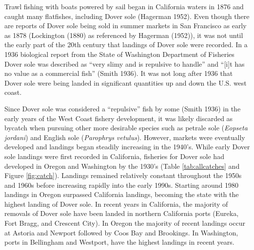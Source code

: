 \documentclass[11pt,
  english,
  a4paper,
]{article}
\begin{document}

Trawl fishing with boats powered by sail began in California waters in 1876 and caught many flatfishes, including Dover sole {(Hagerman 1952)\leavevmode\tagmcend\tagstructend}. Even though there are reports of Dover sole being sold in summer markets in San Francisco as early as 1878 (Lockington {(1880)\leavevmode\tagmcend\tagstructend} as referenced by Hagerman {(1952)\leavevmode\tagmcend\tagstructend}), it was not until the early part of the 20th century that landings of Dover sole were recorded. In a 1936 biological report from the State of Washington Department of Fisheries Dover sole was described as ``very slimy and is repulsive to handle'' and ``{[}i{]}t has no value as a commercial fish'' {(Smith 1936)\leavevmode\tagmcend\tagstructend}. It was not long after 1936 that Dover sole were being landed in significant quantities up and down the U.S. west coast.

\leavevmode\tagmcend\tagstructend\par


Since Dover sole was considered a ``repulsive'' fish by some {(Smith 1936)\leavevmode\tagmcend\tagstructend} in the early years of the West Coast fishery development, it was likely discarded as bycatch when pursuing other more desirable species such as petrale sole (\emph{Eopseta jordani}) and English sole (\emph{Parophrys vetulus}). However, markets were eventually developed and landings began steadily increasing in the 1940's. While early Dover sole landings were first recorded in California, fisheries for Dover sole had developed in Oregon and Washington by the 1930's (Table \ref{tab:allcatches} and Figure \ref{fig:catch}). Landings remained relatively constant throughout the 1950s and 1960s before increasing rapidly into the early 1990s. Starting around 1980 landings in Oregon surpassed California landings, becoming the state with the highest landing of Dover sole. In recent years in California, the majority of removals of Dover sole have been landed in northern California ports (Eureka, Fort Bragg, and Crescent City). In Oregon the majority of recent landings occur at Astoria and Newport followed by Coos Bay and Brookings. In Washington, ports in Bellingham and Westport, have the highest landings in recent years.
\end{document}
